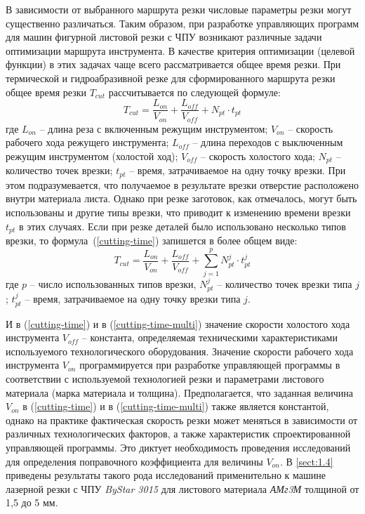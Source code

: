 \documentclass[11pt,twoside,openany]{report}
\begin{document}
В зависимости от выбранного маршрута резки
числовые параметры резки могут существенно различаться.
Таким образом, при разработке управляющих программ
для машин фигурной листовой резки с ЧПУ возникают
различные задачи оптимизации маршрута инструмента.
В качестве критерия оптимизации (целевой функции)
в этих задачах чаще всего рассматривается общее время резки.
При термической и гидроабразивной резке для сформированного
маршрута резки общее время резки
$T_{cut}$
рассчитывается по следующей формуле:
\begin{equation}
  T_{cut} = \frac{L_{on}}{V_{on}} + \frac{L_{off}}{V_{off}} +N_{pt} \cdot t_{pt}
  \label{cutting-time}
\end{equation}
где
$L_{on}$ -- длина реза с включенным режущим инструментом;
$V_{on}$ -- скорость рабочего хода режущего инструмента;
$L_{off}$ -- длина переходов с выключенным режущим инструментом (холостой ход);
$V_{off}$ -- скорость холостого хода;
$N_{pt}$ -- количество точек врезки;
$t_{pt}$ -- время, затрачиваемое на одну точку врезки.
При этом подразумевается,
что получаемое в результате врезки отверстие
расположено внутри материала листа.
Однако при резке заготовок, как отмечалось,
могут быть использованы и другие типы врезки,
что приводит к изменению времени врезки
$t_{pt}$
в этих случаях.
Если при резке деталей было использовано несколько типов врезки,
то формула~(\ref{cutting-time}) запишется в более общем виде:
\begin{equation}
  T_{cut} = \frac{L_{on}}{V_{on}} + \frac{L_{off}}{V_{off}} +
  \sum_{j=1}^p N_{pt}^j \cdot t_{pt}^j
  \label{cutting-time-multi}
\end{equation}
где
$p$ -- число использованных типов врезки,
$N_{pt}^j$ -- количество точек врезки типа $j$;
$t_{pt}^j$ -- время, затрачиваемое на одну точку врезки типа $j$.

И в (\ref{cutting-time})
и в (\ref{cutting-time-multi})
значение скорости холостого хода инструмента
$V_{off}$ -- константа,
определяемая техническими характеристиками
используемого технологического оборудования.
Значение скорости рабочего хода инструмента
$V_{on}$
программируется при разработке управляющей программы
в соответствии с используемой технологией резки
и параметрами листового материала
(марка материала и толщина).
Предполагается, что заданная величина
$V_{on}$  в (\ref{cutting-time}) и в (\ref{cutting-time-multi})
также является константой,
однако на практике фактическая скорость резки
может меняться в зависимости от различных технологических факторов,
а также характеристик спроектированной управляющей программы.
Это диктует необходимость проведения исследований для
определения поправочного коэффициента для величины
$V_{on}$.
В \ref{sect:1.4}
приведены результаты такого рода исследований
применительно к машине лазерной резки с ЧПУ
\textit{ByStar 3015}
для листового материала
\textit{АМг3М} толщиной от 1,5 до 5 мм.
\end{document}
